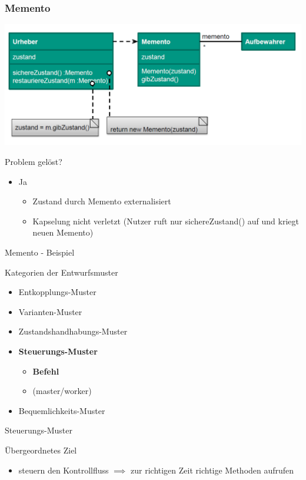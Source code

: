 \documentclass[18pt]{beamer}
\newcommand{\cmark}{\ding{51}}%
\newcommand{\correct}{\textcolor{green}{\cmark}}
\begin{document}
	\begin{frame}
		\frametitle{Memento}
		\includegraphics[scale=0.4]{./pics/tut4/mem.png}
		\begin{block}{Problem gelöst?}
			\begin{itemize}
				\pause
				\item Ja
				\begin{itemize}
					\pause
					\item Zustand durch Memento externalisiert \pause
					\item Kapselung nicht verletzt (Nutzer ruft nur sichereZustand() auf und kriegt neuen Memento)
				\end{itemize}
			\end{itemize}
		\end{block}
	\end{frame}

	\begin{frame}{Memento - Beispiel}
	\end{frame}

	\begin{frame}{Kategorien der Entwurfsmuster}
		\begin{itemize}
			\item Entkopplungs-Muster \correct
			\item Varianten-Muster \correct
			\item Zustandshandhabungs-Muster \correct
			\item \textbf{Steuerungs-Muster} 
				\begin{itemize}
					\item \textbf{Befehl}
					\item (master/worker)
				\end{itemize}
			\item Bequemlichkeits-Muster
		\end{itemize}
	\end{frame}
	
	\begin{frame}{Steuerungs-Muster}
		\begin{block}{Übergeordnetes Ziel}
			\begin{itemize}
				\item steuern den Kontrollfluss \pause 
				\linebreak $\implies$ zur richtigen Zeit richtige Methoden aufrufen
			\end{itemize}
		\end{block}
	\end{frame}
\end{document}

